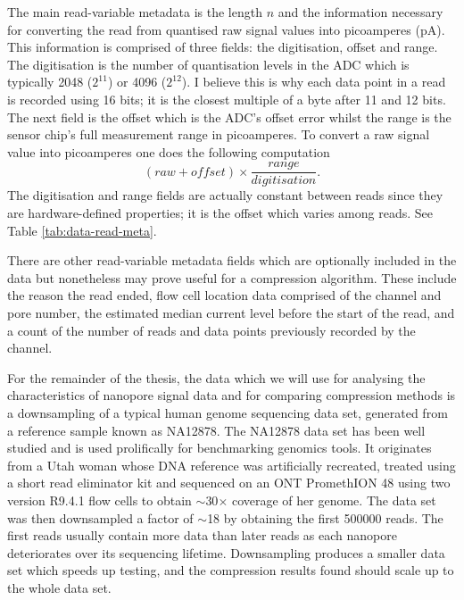 The main read-variable metadata is the length $n$ and the information necessary for converting the read from quantised raw signal values into picoamperes (pA). This information is comprised of three fields: the digitisation, offset and range. The digitisation is the number of quantisation levels in the ADC which is typically 2048 ($2^{11}$) or 4096 ($2^{12}$). I believe this is why each data point in a read is recorded using 16 bits; it is the closest multiple of a byte after 11 and 12 bits. The next field is the offset which is the ADC's offset error whilst the range is the sensor chip's full measurement range in picoamperes. To convert a raw signal value into picoamperes one does the following computation
\begin{equation}(raw + offset) \times \frac{range}{digitisation}. \label{eq:pa}\end{equation}
The digitisation and range fields are actually constant between reads since they are hardware-defined properties; it is the offset which varies among reads. See Table \ref{tab:data-read-meta}.

There are other read-variable metadata fields which are optionally included in the data but nonetheless may prove useful for a compression algorithm. These include the reason the read ended, flow cell location data comprised of the channel and pore number, the estimated median current level before the start of the read, and a count of the number of reads and data points previously recorded by the channel.

For the remainder of the thesis, the data which we will use for analysing the characteristics of nanopore signal data and for comparing compression methods is a downsampling of a typical human genome sequencing data set, generated from a reference sample known as NA12878. The NA12878 data set has been well studied and is used prolifically for benchmarking genomics tools. It originates from a Utah woman whose DNA reference was artificially recreated, treated using a short read eliminator kit and sequenced on an ONT PromethION 48 using two version R9.4.1 flow cells to obtain $\sim$30$\times$ coverage of her genome.
The data set was then downsampled a factor of $\sim$18 by obtaining the first \num{500000} reads.
The first reads usually contain more data than later reads as each nanopore deteriorates over its sequencing lifetime.
Downsampling produces a smaller data set which speeds up testing, and the compression results found should scale up to the whole data set.

